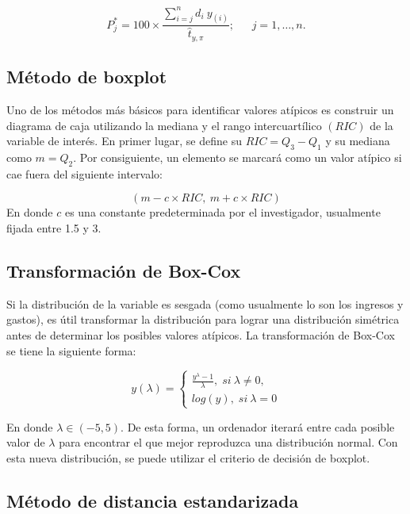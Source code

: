 \documentclass[
  12pt,
  spanish,
]{book}
\begin{document}
\[
P_j^*=100\times\frac{\sum_{i=j}^n d_i \ y_{(i)}}{\hat t_{y, \pi}}; \ \ \ \ \ \ \ j = 1, \ldots, n.
\]

\hypertarget{muxe9todo-de-boxplot}{%
\subsection{Método de boxplot}\label{muxe9todo-de-boxplot}}

Uno de los métodos más básicos para identificar valores atípicos es construir un diagrama de caja utilizando la mediana y el rango intercuartílico \((RIC)\) de la variable de interés. En primer lugar, se define su \(RIC = Q_3 - Q_1\) y su mediana como \(m=Q_2\). Por consiguiente, un elemento se marcará como un valor atípico si cae fuera del siguiente intervalo:

\[
(m-c \times RIC,\ m+c \times RIC)
\]
En donde \(c\) es una constante predeterminada por el investigador, usualmente fijada entre 1.5 y 3.

\hypertarget{transformaciuxf3n-de-box-cox}{%
\subsection{Transformación de Box-Cox}\label{transformaciuxf3n-de-box-cox}}

Si la distribución de la variable es sesgada (como usualmente lo son los ingresos y gastos), es útil transformar la distribución para lograr una distribución simétrica antes de determinar los posibles valores atípicos. La transformación de Box-Cox se tiene la siguiente forma:

\[
y(\lambda)=
\left\{
\begin{matrix}\frac{y^\lambda-1}{\lambda},\; si\ \lambda\neq0,\\
log(y),\;si\ \lambda=0
\end{matrix}\right.
\]

En donde \(\lambda\in(-5,5)\). De esta forma, un ordenador iterará entre cada posible valor de \(\lambda\) para encontrar el que mejor reproduzca una distribución normal. Con esta nueva distribución, se puede utilizar el criterio de decisión de boxplot.

\hypertarget{muxe9todo-de-distancia-estandarizada}{%
\subsection{Método de distancia estandarizada}\label{muxe9todo-de-distancia-estandarizada}}
\end{document}
